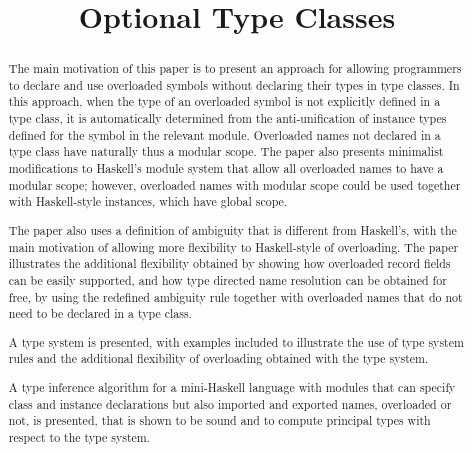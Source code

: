 \documentclass[review]{elsarticle}
\begin{document}
\begin{frontmatter}

\title{Optional Type Classes}

\begin{abstract}

The main motivation of this paper is to present an approach for
allowing programmers to declare and use overloaded symbols without
declaring their types in type classes. In this approach, when the type
of an overloaded symbol is not explicitly defined in a type class, it
is automatically determined from the anti-unification of instance
types defined for the symbol in the relevant module. Overloaded names
not declared in a type class have naturally thus a modular scope. The
paper also presents minimalist modifications to Haskell's module
system that allow all overloaded names to have a modular scope;
however, overloaded names with modular scope could be used together
with Haskell-style instances, which have global scope.

The paper also uses a definition of ambiguity that is different from
Haskell's, with the main motivation of allowing more flexibility to
Haskell-style of overloading. The paper illustrates the additional
flexibility obtained by showing how overloaded record fields can be
easily supported, and how type directed name resolution can be
obtained for free, by using the redefined ambiguity rule together with
overloaded names that do not need to be declared in a type class.

A type system is presented, with examples included to illustrate the
use of type system rules and the additional flexibility of overloading
obtained with the type system.


A type inference algorithm  %
for a mini-Haskell language with
modules that can specify class and instance declarations but also
imported and exported names, overloaded or not, is presented, that is
shown to be sound and to compute principal types with respect to the
type system.


\end{abstract}
\end{frontmatter}
\end{document}
